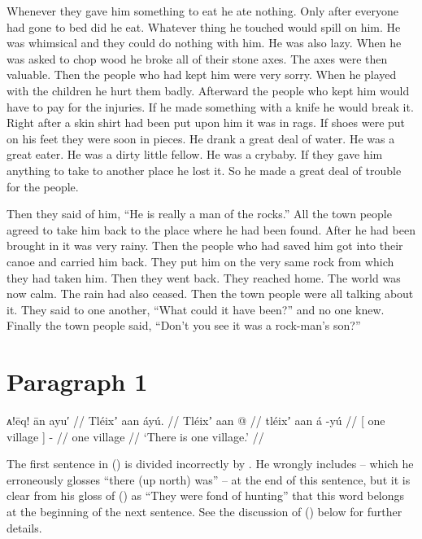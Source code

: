 Whenever they gave him something to eat he ate nothing.
Only after everyone had gone to bed did he eat.
Whatever thing he touched would spill on him.
\!He was whimsical and they could do nothing with him.
He was also lazy.
When he was asked to chop wood he broke all of their stone axes.
The axes were then valuable.
Then the people who had kept him were very sorry.
When he played with the children he hurt them badly.
Afterward the people who kept him would have to pay for the injuries.
If he made something with a knife he would break it.
Right after a skin shirt had been put upon him it was in rags.
If shoes were put on his feet they were soon in pieces.
He drank a great deal of water.
He was a great eater.
He was a dirty little fellow.
He was a crybaby.
If they gave him anything to take to another place he lost it.
So he made a great deal of trouble for the people.

Then they said of him, “He is really a man of the rocks.” All the town people agreed to take him back to the place where he had been found.
After he had been brought in it was very rainy.
Then the people who had saved him got into their canoe and carried him back.
They put him on the very same rock from which they had taken him.
Then they went back.
They reached home.
The world was now calm.
The rain had also ceased.
Then the town people were all talking about it.
They said to one another, “What could it have been?” and no one knew.
Finally the town people said, “Don’t you see it was a rock-man’s son?”

\section{Paragraph 1}\label{sec:106-para-1}
\resetexcnt

\ex\label{ex:106-1-one-town}%
%
\begingl
	\glpreamble	ᴀ!ēq! ān ayu′ //
	\glpreamble	Tléixʼ aan áyú. //
	\gla	{} Tléixʼ aan {}  @ {} //
	\glb	{} tléixʼ aan {} á -yú //
	\glc	{}[ one village {}]  - //
	\gld	{} one village {}  //
	\glft	‘There is one village.’
		//
\endgl
\xe

The first sentence in (\lastx) is divided incorrectly by \citeauthor{swanton:1909}.
He wrongly includes  – which he erroneously glosses “there (up north) was” – at the end of this sentence, but it is clear from his gloss of (\nextx) as “They were fond of hunting” that this word belongs at the beginning of the next sentence.
See the discussion of (\nextx) below for further details.

